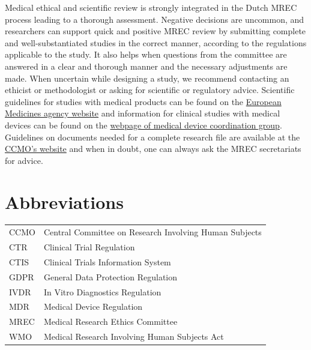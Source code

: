 \documentclass[authordate, meta]{jote-new-article}
\begin{document}
Medical ethical and scientific review is strongly integrated in the Dutch MREC process leading to a thorough assessment. Negative decisions are uncommon, and researchers can support quick and positive MREC review by submitting complete and well-substantiated studies in the correct manner, according to the regulations applicable to the study. It also helps when questions from the committee are answered in a clear and thorough manner and the necessary adjustments are made. When uncertain while designing a study, we recommend contacting an ethicist or methodologist or asking for scientific or regulatory advice. Scientific guidelines for studies with medical products can be found on the \href{https://www.ema.europa.eu/en/human-regulatory/research-development/scientific-guidelines/ich-guidelines}{European Medicines agency website} and information for clinical studies with medical devices can be found on the \href{https://health.ec.europa.eu/medical-devices-dialogue-between-interested-parties/medical-device-coordination-group-working-groups}{webpage of medical device coordination group}. Guidelines on documents needed for a complete research file are available at the \href{https://www.ccmo.nl/}{CCMO's website} and when in doubt, one can always ask the MREC secretariats for advice.




\section{Abbreviations}

\begin{tabularx}{\linewidth}{l X}
  CCMO & Central Committee on Research Involving Human Subjects \\
  CTR  & Clinical Trial Regulation                              \\
  CTIS & Clinical Trials Information System                     \\
  GDPR & General Data Protection Regulation                     \\
  IVDR & In Vitro Diagnostics Regulation                        \\
  MDR  & Medical Device Regulation                              \\
  MREC & Medical Research Ethics Committee                      \\
  WMO  & Medical Research Involving Human Subjects Act
\end{tabularx}
\end{document}
